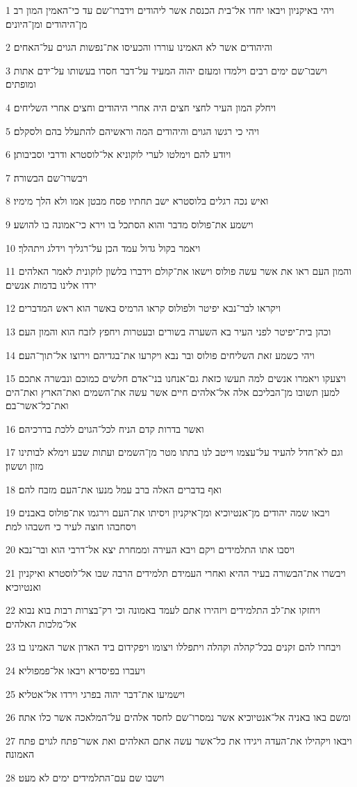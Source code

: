 \par 1 ויהי באיקניון ויבאו יחדו אל־בית הכנסת אשר ליהודים וידברו־שם עד כי־האמין המון רב מן־היהודים ומן־היונים׃
\par 2 והיהודים אשר לא האמינו עוררו והכעיסו את־נפשות הגוים על־האחים׃
\par 3 וישבו־שם ימים רבים וילמדו ומעזם יהוה המעיד על־דבר חסדו בעשותו על־ידם אתות ומופתים׃
\par 4 ויחלק המון העיר לחצי חצים היה אחרי היהודים וחצים אחרי השליחים׃
\par 5 ויהי כי רגשו הגוים והיהודים המה וראשיהם להתעלל בהם ולסקלם׃
\par 6 ויודע להם וימלטו לערי לוקוניא אל־לוסטרא ודרבי וסביבותן׃
\par 7 ויבשרו־שם הבשורה׃
\par 8 ואיש נכה רגלים בלוסטרא ישב תחתיו פסח מבטן אמו ולא הלך מימיו׃
\par 9 וישמע את־פולוס מדבר והוא הסתכל בו וירא כי־אמונה בו להושע׃
\par 10 ויאמר בקול גדול עמד הכן על־רגליך וידלג ויתהלך׃
\par 11 והמון העם ראו את אשר עשה פולוס וישאו את־קולם וידברו בלשון לוקונית לאמר האלהים ירדו אלינו בדמות אנשים׃
\par 12 ויקראו לבר־נבא יפיטר ולפולוס קראו הרמיס באשר הוא ראש המדברים׃
\par 13 וכהן בית־יפיטר לפני העיר בא השערה בשורים ובעטרות ויחפץ לזבח הוא והמון העם׃
\par 14 ויהי כשמע זאת השליחים פולוס ובר נבא ויקרעו את־בגדיהם וירוצו אל־תוך־העם׃
\par 15 ויצעקו ויאמרו אנשים למה תעשו כזאת גם־אנחנו בני־אדם חלשים כמוכם ונבשרה אתכם למען תשובו מן־הבליכם אלה אל־אלהים חיים אשר עשה את־השמים ואת־הארץ ואת־הים ואת־כל־אשר־בם׃
\par 16 ואשר בדרות קדם הניח לכל־הגוים ללכת בדרכיהם׃
\par 17 וגם לא־חדל להעיד על־עצמו וייטב לנו בתתו מטר מן־השמים ועתות שבע וימלא לבותינו מזון וששון׃
\par 18 ואף בדברים האלה ברב עמל מנעו את־העם מזבח להם׃
\par 19 ויבאו שמה יהודים מן־אנטיוכיא ומן־איקניון ויסיתו את־העם וירגמו את־פולוס באבנים ויסחבהו חוצה לעיר כי חשבהו למת׃
\par 20 ויסבו אתו התלמידים ויקם ויבא העירה וממחרת יצא אל־דרבי הוא ובר־נבא׃
\par 21 ויבשרו את־הבשורה בעיר ההיא ואחרי העמידם תלמידים הרבה שבו אל־לוסטרא ואיקניון ואנטיוכיא׃
\par 22 ויחזקו את־לב התלמידים ויזהירו אתם לעמד באמונה וכי רק־בצרות רבות בוא נבוא אל־מלכות האלהים׃
\par 23 ויבחרו להם זקנים בכל־קהלה וקהלה ויתפללו ויצומו ויפקידום ביד האדון אשר האמינו בו׃
\par 24 ויעברו בפיסדיא ויבאו אל־פמפוליא׃
\par 25 וישמיעו את־דבר יהוה בפרגי וירדו אל־אטליא׃
\par 26 ומשם באו באניה אל־אנטיוכיא אשר נמסרו־שם לחסד אלהים על־המלאכה אשר כלו אתה׃
\par 27 ויבאו ויקהילו את־העדה ויגידו את כל־אשר עשה אתם האלהים ואת אשר־פתח לגוים פתח האמונה׃
\par 28 וישבו שם עם־התלמידים ימים לא מעט׃

